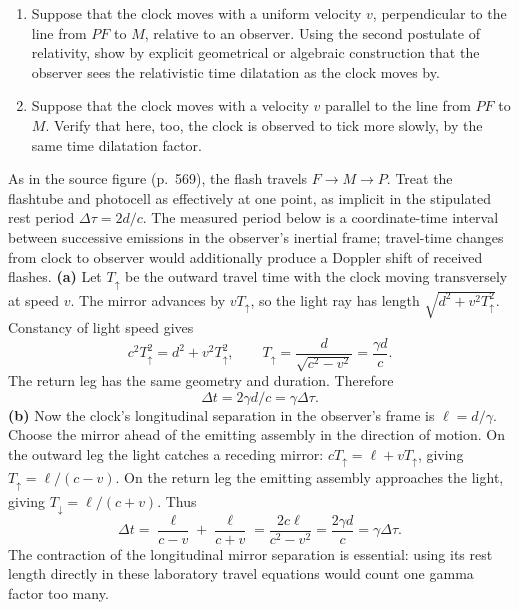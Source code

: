 \begin{enumerate}
\item[(a)] Suppose that the clock moves with a uniform velocity $v$, perpendicular to the line from $PF$ to $M$, relative to an observer. Using the second postulate of relativity, show by explicit geometrical or algebraic construction that the observer sees the relativistic time dilatation as the clock moves by.
\item[(b)] Suppose that the clock moves with a velocity $v$ parallel to the line from $PF$ to $M$. Verify that here, too, the clock is observed to tick more slowly, by the same time dilatation factor.
\end{enumerate}
\solution
As in the source figure (p.~569), the flash travels $F\to M\to P$.
Treat the flashtube and photocell as effectively at one point, as
implicit in the stipulated rest period $\Delta\tau=2d/c$.
The measured period below is a coordinate-time interval between
successive emissions in the observer's inertial frame; travel-time
changes from clock to observer would additionally produce a Doppler
shift of received flashes.
\textbf{(a)} Let $T_\uparrow$ be the outward travel time with the
clock moving transversely at speed $v$. The mirror advances by
$vT_\uparrow$, so the light ray has length
$\sqrt{d^2+v^2T_\uparrow^2}$. Constancy of light speed gives
\[
c^2T_\uparrow^2=d^2+v^2T_\uparrow^2,
\qquad T_\uparrow=\frac{d}{\sqrt{c^2-v^2}}=\frac{\gamma d}{c}.
\]
The return leg has the same geometry and duration. Therefore
\[
\boxed{\Delta t=2\gamma d/c=\gamma\Delta\tau.}
\]
\textbf{(b)} Now the clock's longitudinal separation in the observer's
frame is $\ell=d/\gamma$. Choose the mirror ahead of the emitting
assembly in the direction of motion. On the outward leg the light
catches a receding mirror:
$cT_\uparrow=\ell+vT_\uparrow$, giving
$T_\uparrow=\ell/(c-v)$.
On the return leg the emitting assembly approaches the light, giving
$T_\downarrow=\ell/(c+v)$. Thus
\[
\Delta t=\frac\ell{c-v}+\frac\ell{c+v}
=\frac{2c\ell}{c^2-v^2}
=\boxed{\frac{2\gamma d}{c}=\gamma\Delta\tau.}
\]
The contraction of the longitudinal mirror separation is essential:
using its rest length directly in these laboratory travel equations
would count one gamma factor too many.

